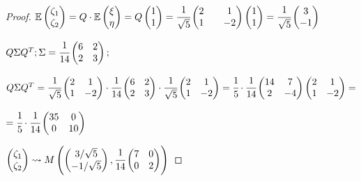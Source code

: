 \begin{proof}
 	$ \mathbb E\begin{pmatrix} \zeta_1 \\ \zeta_2 \end{pmatrix}=Q\cdot\mathbb E\begin{pmatrix} \xi \\ \eta \end{pmatrix}=Q\begin{pmatrix} 1 \\ 1 \end{pmatrix}=\cfrac{1}{\sqrt{5}}\begin{pmatrix} 2 && 1 \\ 1 && -2 \end{pmatrix}\begin{pmatrix} 1 \\ 1 \end{pmatrix} = \cfrac{1}{\sqrt{5}}\begin{pmatrix} 3 \\ -1 \end{pmatrix} $
 	
 	$ Q \Sigma Q^T; \Sigma = \cfrac1{14}\begin{pmatrix} 6 & 2 \\ 2 & 3 \end{pmatrix}; $
 	
 	$ Q \Sigma Q^T = \cfrac{1}{\sqrt{5}}\begin{pmatrix} 2 & 1 \\ 1 & -2 \end{pmatrix}\cdot\cfrac{1}{14}\begin{pmatrix} 6 & 2 \\ 2 & 3 \end{pmatrix}\cdot\cfrac{1}{\sqrt{5}}\begin{pmatrix} 2 & 1 \\ 1 & -2 \end{pmatrix}=\cfrac15\cdot\cfrac1{14}\begin{pmatrix} 14 & 7 \\ 2 & -4 \end{pmatrix}\begin{pmatrix} 2 & 1 \\ 1 & -2 \end{pmatrix}= $
 	
 	$ =\cfrac15\cdot\cfrac1{14}\begin{pmatrix} 35 & 0 \\ 0 & 10 \end{pmatrix} $

	$ \begin{pmatrix} \zeta_1 \\ \zeta_2 \end{pmatrix} \rightsquigarrow M \left(\begin{pmatrix} 3/\sqrt{5} \\ -1/\sqrt{5} \end{pmatrix}, \cfrac1{14}\begin{pmatrix} 7 & 0 \\ 0 & 2 \end{pmatrix}\right) $
	
\end{proof}

